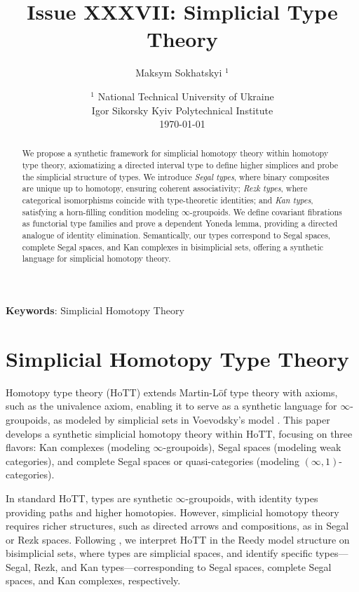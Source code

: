 \documentclass{article}
\begin{document}
\title{Issue XXXVII: Simplicial Type Theory}
\author{Maksym Sokhatskyi $^1$}
\date{ $^1$ National Technical University of Ukraine \\
       \small Igor Sikorsky Kyiv Polytechnical Institute \\
       \today }

\maketitle

\begin{abstract}
We propose a synthetic framework for simplicial homotopy theory within
homotopy type theory, axiomatizing a directed interval type to define
higher simplices and probe the simplicial structure of types.
We introduce \emph{Segal types}, where binary composites are
unique up to homotopy, ensuring coherent associativity; \emph{Rezk types},
where categorical isomorphisms coincide with type-theoretic identities;
and \emph{Kan types}, satisfying a horn-filling condition modeling $\infty$-groupoids.
We define covariant fibrations as functorial type families and prove a dependent
Yoneda lemma, providing a directed analogue of identity elimination.
Semantically, our types correspond to Segal spaces, complete Segal spaces,
and Kan complexes in bisimplicial sets, offering a synthetic language for
simplicial homotopy theory.
\end{abstract}

{\bf Keywords}: Simplicial Homotopy Theory


\ifincludeTOC
  \tableofcontents
\fi

\newpage
\section{Simplicial Homotopy Type Theory}

Homotopy type theory (HoTT) \cite{Uni13} extends Martin-L\"of type theory with axioms, such as the univalence axiom, enabling it to serve as a synthetic language for $\infty$-groupoids, as modeled by simplicial sets in Voevodsky’s model \cite{KL12}. This paper develops a synthetic simplicial homotopy theory within HoTT, focusing on three flavors: Kan complexes (modeling $\infty$-groupoids), Segal spaces (modeling weak categories), and complete Segal spaces or quasi-categories (modeling $(\infty,1)$-categories).

In standard HoTT, types are synthetic $\infty$-groupoids, with identity types providing paths and higher homotopies. However, simplicial homotopy theory requires richer structures, such as directed arrows and compositions, as in Segal or Rezk spaces. Following \cite{Shu15}, we interpret HoTT in the Reedy model structure on bisimplicial sets, where types are simplicial spaces, and identify specific types—Segal, Rezk, and Kan types—corresponding to Segal spaces, complete Segal spaces, and Kan complexes, respectively.
\end{document}
